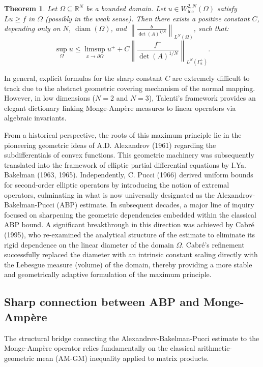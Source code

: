 \documentclass[10pt,a4paper]{amsart}
\newtheorem{theorem}{Theorem}[section]
\numberwithin{equation}{section}
\begin{document}
\begin{theorem}
Let $\Omega \subseteq \mathbb{R}^N$ be a bounded domain. Let $u \in W^{2,N}_{\text{loc}}(\Omega)$ satisfy $Lu \ge f$ in $\Omega$ (possibly in the weak sense). Then there exists a positive constant $C$, depending only on $N$, $\operatorname{diam}(\Omega)$, and $\left\|\frac{b}{\det(A)^{1/N}}\right\|_{L^N(\Omega)}$, such that:
\[
\sup_\Omega u \le \limsup_{x \to \partial\Omega} u^+ + C \left\| \frac{f^-}{\det(A)^{1/N}} \right\|_{L^N(\Gamma^+_u)}.
\]
\end{theorem}

\noindent In general, explicit formulas for the sharp constant $C$ are extremely difficult to track due to the abstract geometric covering mechanism of the normal mapping. However, in low dimensions ($N=2$ and $N=3$), Talenti's framework provides an elegant dictionary linking Monge-Ampère measures to linear operators via algebraic invariants.

\noindent From a historical perspective, the roots of this maximum principle lie in the pioneering geometric ideas of A.D. Alexandrov (1961) regarding the subdifferentials of convex functions. This geometric machinery was subsequently translated into the framework of elliptic partial differential equations by I.Ya. Bakelman (1963, 1965). Independently, C. Pucci (1966) derived uniform bounds for second-order elliptic operators by introducing the notion of extremal operators, culminating in what is now universally designated as the Alexandrov-Bakelman-Pucci (ABP) estimate. In subsequent decades, a major line of inquiry focused on sharpening the geometric dependencies embedded within the classical ABP bound. A significant breakthrough in this direction was achieved by Cabré (1995), who re-examined the analytical structure of the estimate to eliminate its rigid dependence on the linear diameter of the domain $\Omega$. Cabré's refinement successfully replaced the diameter with an intrinsic constant scaling directly with the Lebesgue measure (volume) of the domain, thereby providing a more stable and geometrically adaptive formulation of the maximum principle.

\subsection{Sharp connection between ABP and Monge-Ampère}

The structural bridge connecting the Alexandrov-Bakelman-Pucci estimate to the Monge-Ampère operator relies fundamentally on the classical arithmetic-geometric mean (AM-GM) inequality applied to matrix products.
\end{document}
